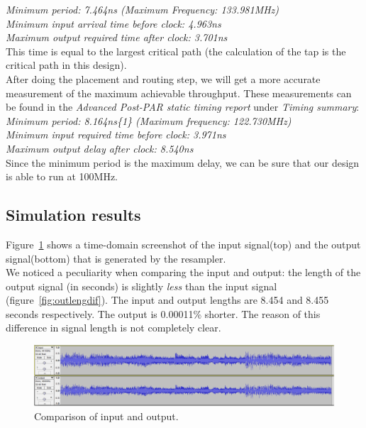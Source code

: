 \documentclass[a4paper,twoside,11pt, fleqn]{article}
\begin{document}
   \textit{Minimum period:  7.464ns (Maximum Frequency: 133.981MHz)\\
   Minimum input arrival time before clock: 4.963ns\\
   Maximum output required time after clock: 3.701ns}\\

This time is equal to the largest critical path (the calculation of the tap is the critical path in this design).\\

After doing the placement and routing step, we will get a more accurate measurement of the maximum achievable throughput. These measurements can be found in the \textit{Advanced Post-PAR static timing report} under \textit{Timing summary}:\\

\textit{Minimum period:   8.164ns\{1\}   (Maximum frequency: 122.730MHz)\\
   Minimum input required time before clock:   3.971ns\\
   Maximum output delay after clock:   8.540ns}\\

Since the minimum period is the maximum delay, we can be sure that our design is able to run at 100MHz.

\newpage
\subsection{Simulation results}
Figure~\ref{fig:compInOut} shows a time-domain screenshot of the input signal(top) and the output signal(bottom) that is generated by the resampler.\\

We noticed a peculiarity when comparing the input and output: the length of the output signal (in seconds) is slightly \textit{less} than the input signal (figure~\ref{fig:outlengdif}). The input and output lengths are 8.454 and 8.455 seconds respectively. The output is 0.00011\% shorter. The reason of this difference in signal length is not completely clear.
\begin{figure}[h]
	\includegraphics[scale = 0.40]{Images/simulationresults.png}
    \caption{Comparison of input and output.}
    \label{fig:compInOut}
\end{figure}
\end{document}
